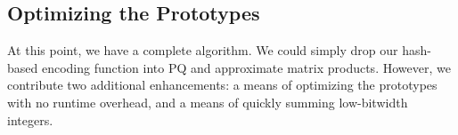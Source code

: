 

\vspace{-1.5mm}
\subsection{Optimizing the Prototypes}
\vspace{-.5mm}

At this point, we have a complete algorithm. We could simply drop our hash-based encoding function into PQ and approximate matrix products. However, we contribute two additional enhancements: a means of optimizing the prototypes with no runtime overhead, and a means of quickly summing low-bitwidth integers.

